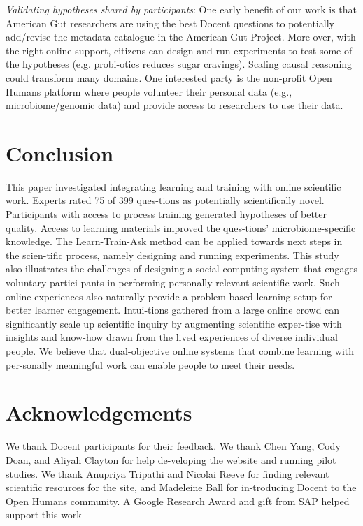 \textit{Validating hypotheses shared by participants}: One early benefit of our work is that American Gut researchers are using the best Docent questions to potentially add/revise the metadata catalogue in the American Gut Project. More-over, with the right online support, citizens can design and run experiments to test some of the hypotheses (e.g. probi-otics reduces sugar cravings). Scaling causal reasoning could transform many domains. One interested party is the non-profit Open Humans platform where people volunteer their personal data (e.g., microbiome/genomic data) and provide access to researchers to use their data.

\section{Conclusion}
This paper investigated integrating learning and training with online scientific work. Experts rated 75 of 399 ques-tions as potentially scientifically novel. Participants with access to process training generated hypotheses of better quality. Access to learning materials improved the ques-tions’ microbiome-specific knowledge.  The Learn-Train-Ask method can be applied towards next steps in the scien-tific process, namely designing and running experiments. This study also illustrates the challenges of designing a social computing system that engages voluntary partici-pants in performing personally-relevant scientific work. Such online experiences also naturally provide a problem-based learning setup for better learner engagement. Intui-tions gathered from a large online crowd can significantly scale up scientific inquiry by augmenting scientific exper-tise with insights and know-how drawn from the lived experiences of diverse individual people. We believe that dual-objective online systems that combine learning with per-sonally meaningful work can enable people to meet their needs.

\section{Acknowledgements}
We thank Docent participants for their feedback. We thank Chen Yang, Cody Doan, and Aliyah Clayton for help de-veloping the website and running pilot studies. We thank Anupriya Tripathi and Nicolai Reeve for finding relevant scientific resources for the site, and Madeleine Ball for in-troducing Docent to the Open Humans community. A Google Research Award and gift from SAP helped support this work


